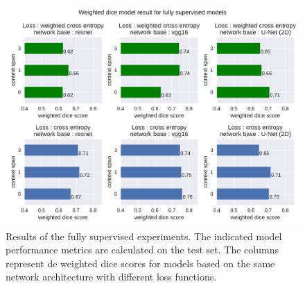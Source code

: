 \begin{figure}
    \centering
    \includegraphics[width=.98\textwidth]{images/FullySupervised.pdf}
    \caption{Results of the fully supervised experiments.
    The indicated model performance metrics are calculated on the test set.
    The columns represent de weighted dice scores for models based on the same network architecture with different loss functions.
    \label{fig:referenceExperiments}}
\end{figure}

